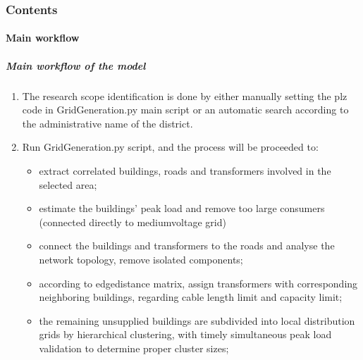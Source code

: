 \documentclass[letterpaper,10pt,english]{sphinxmanual}
\begin{document}
\subsubsection{Contents}
\label{\detokenize{grid_generation/index:contents}}
\sphinxstepscope


\paragraph{Main workflow}
\label{\detokenize{grid_generation/main_workflow/main_workflow:main-workflow}}\label{\detokenize{grid_generation/main_workflow/main_workflow::doc}}

\subparagraph{Main workflow of the model}
\label{\detokenize{grid_generation/main_workflow/main_workflow:main-workflow-of-the-model}}\begin{enumerate}
%
\item {} 
\sphinxAtStartPar
The research scope identification is done by either manually setting the plz code in GridGeneration.py main script or
an automatic search according to the administrative name of the district.

\item {} 
\sphinxAtStartPar
Run GridGeneration.py script, and the process will be proceeded to:
\begin{itemize}
\item {} 
\sphinxAtStartPar
extract correlated buildings, roads and transformers involved in the selected area;

\item {} 
\sphinxAtStartPar
estimate the buildings’ peak load and remove too large consumers (connected directly to medium\sphinxhyphen{}voltage grid)

\item {} 
\sphinxAtStartPar
connect the buildings and transformers to the roads and analyse the network topology, remove isolated components;

\item {} 
\sphinxAtStartPar
according to edge\sphinxhyphen{}distance matrix, assign transformers with corresponding neighboring buildings, regarding cable
length limit and capacity limit;

\item {} 
\sphinxAtStartPar
the remaining unsupplied buildings are subdivided into local distribution grids by hierarchical clustering, with
timely simultaneous peak load validation to determine proper cluster sizes;


\end{itemize}
\end{enumerate}
\end{document}
